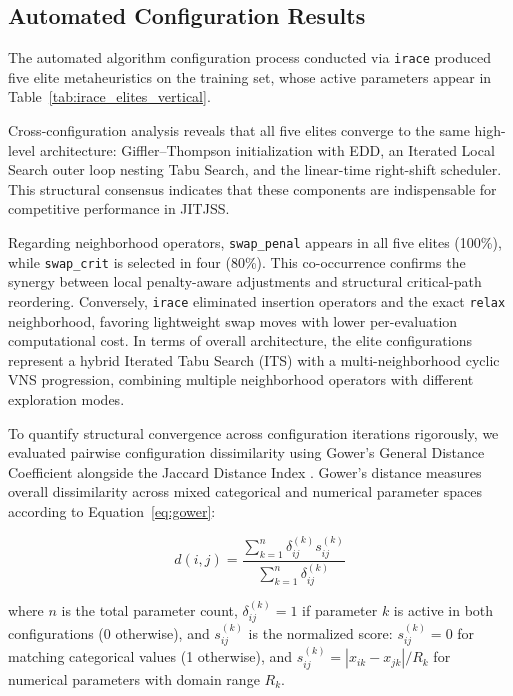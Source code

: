\subsection{Automated Configuration Results}
\label{subsec:irace_results}

The automated algorithm configuration process conducted via \texttt{irace} produced five elite metaheuristics on the training set, whose active parameters appear in Table~\ref{tab:irace_elites_vertical}.



Cross-configuration analysis reveals that all five elites converge to the same high-level architecture: Giffler--Thompson initialization with EDD, an Iterated Local Search outer loop nesting Tabu Search, and the linear-time right-shift scheduler.
This structural consensus indicates that these components are indispensable for competitive performance in JITJSS.

Regarding neighborhood operators, \texttt{swap\_penal} appears in all five elites (100\%), while \texttt{swap\_crit} is selected in four (80\%). This co-occurrence confirms the synergy between local penalty-aware adjustments \citep{wang2014variable} and structural critical-path reordering.
Conversely, \texttt{irace} eliminated insertion operators and the exact \texttt{relax} neighborhood, favoring lightweight swap moves with lower per-evaluation computational cost.
In terms of overall architecture, the elite configurations represent a hybrid Iterated Tabu Search (ITS) with a multi-neighborhood cyclic VNS progression, combining multiple neighborhood operators with different exploration modes.

To quantify structural convergence across configuration iterations rigorously, we evaluated pairwise configuration dissimilarity using Gower's General Distance Coefficient \citep{gower1971general} alongside the Jaccard Distance Index \citep{jaccard1901etude}.
Gower's distance measures overall dissimilarity across mixed categorical and numerical parameter spaces according to Equation~\eqref{eq:gower}:

\begin{equation} \label{eq:gower}
    d(i,j) = \frac{\sum_{k=1}^n \delta_{ij}^{(k)} s_{ij}^{(k)}}{\sum_{k=1}^n \delta_{ij}^{(k)}}
\end{equation}

where $n$ is the total parameter count, $\delta_{ij}^{(k)} = 1$ if parameter $k$ is active in both configurations (0 otherwise), and $s_{ij}^{(k)}$ is the normalized score: $s_{ij}^{(k)} = 0$ for matching categorical values (1 otherwise), and $s_{ij}^{(k)} = |x_{ik} - x_{jk}| / R_k$ for numerical parameters with domain range $R_k$.

